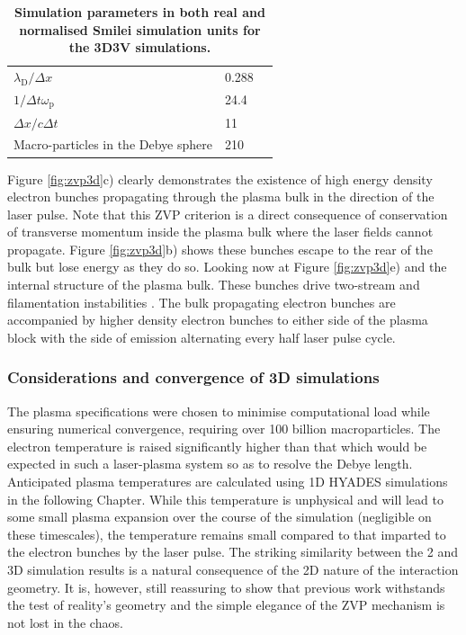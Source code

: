 \begin{table}[]
\begin{center}
\begin{tabular}{lll}
			$\lambda_\mathrm{D}/\Delta x$                               &0.288                                   &  \\
			$1/\Delta t \omega_\mathrm{p}$                             &24.4                                   &  \\
			$\Delta x/c\Delta t$                             &   11                               &  \\
			Macro-particles in the Debye sphere                    &210                                  &  \vspace{0.15cm}\\ \hline \hline 
			
		\end{tabular}
	\end{center}
	\caption{\label{tab:parameters} \textbf{Simulation parameters in both real and normalised Smilei simulation units for the 3D3V simulations.} }
\end{table}
Figure \ref{fig:zvp3d}c) clearly demonstrates the existence of high energy density electron bunches propagating through the plasma bulk in the direction of the laser pulse. Note that this ZVP criterion is a direct consequence of conservation of transverse momentum inside the plasma bulk where the laser fields cannot propagate. Figure \ref{fig:zvp3d}b) shows these bunches escape to the rear of the bulk but lose energy as they do so. Looking now at Figure \ref{fig:zvp3d}e) and the internal structure of the plasma bulk. These bunches drive two-stream and filamentation instabilities \cite{bretMultidimensionalElectronBeamplasma2010}. The bulk propagating electron bunches are accompanied by higher density electron bunches to either side of the plasma block with the side of emission alternating every half laser pulse cycle. 

\subsubsection{Considerations and convergence of 3D simulations}
The plasma specifications were chosen to minimise computational load while ensuring numerical convergence, requiring over 100 billion macroparticles. The electron temperature is raised significantly higher than that which would be expected in such a laser-plasma system so as to resolve the Debye length. Anticipated plasma temperatures are calculated using 1D HYADES simulations in the following Chapter. While this temperature is unphysical and will lead to some small plasma expansion over the course of the simulation (negligible on these timescales), the temperature remains small compared to that imparted to the electron bunches by the laser pulse. The striking similarity between the 2 and 3D simulation results is a natural consequence of the 2D nature of the interaction geometry. It is, however, still reassuring to show that previous work withstands the test of reality's geometry and the simple elegance of the ZVP mechanism is not lost in the chaos. 

